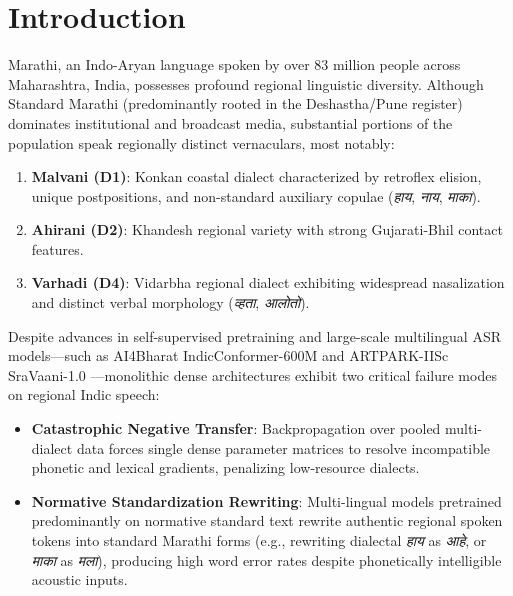 \documentclass{article}
\begin{document}
\section{Introduction}
Marathi, an Indo-Aryan language spoken by over 83 million people across Maharashtra, India, possesses profound regional linguistic diversity. Although Standard Marathi (predominantly rooted in the Deshastha/Pune register) dominates institutional and broadcast media, substantial portions of the population speak regionally distinct vernaculars, most notably:
\begin{enumerate}
    \item \textbf{Malvani (D1)}: Konkan coastal dialect characterized by retroflex elision, unique postpositions, and non-standard auxiliary copulae (\textit{हाय}, \textit{नाय}, \textit{माका}).
    \item \textbf{Ahirani (D2)}: Khandesh regional variety with strong Gujarati-Bhil contact features.
    \item \textbf{Varhadi (D4)}: Vidarbha regional dialect exhibiting widespread nasalization and distinct verbal morphology (\textit{व्हता}, \textit{आलोतो}).
\end{enumerate}

Despite advances in self-supervised pretraining and large-scale multilingual ASR models—such as AI4Bharat IndicConformer-600M \cite{indicconformer2024} and ARTPARK-IISc SraVaani-1.0 \cite{sravaani2024}—monolithic dense architectures exhibit two critical failure modes on regional Indic speech:
\begin{itemize}
    \item \textbf{Catastrophic Negative Transfer}: Backpropagation over pooled multi-dialect data forces single dense parameter matrices to resolve incompatible phonetic and lexical gradients, penalizing low-resource dialects.
    \item \textbf{Normative Standardization Rewriting}: Multi-lingual models pretrained predominantly on normative standard text rewrite authentic regional spoken tokens into standard Marathi forms (e.g., rewriting dialectal \textit{हाय} as \textit{आहे}, or \textit{माका} as \textit{मला}), producing high word error rates despite phonetically intelligible acoustic inputs.
\end{itemize}
\end{document}
